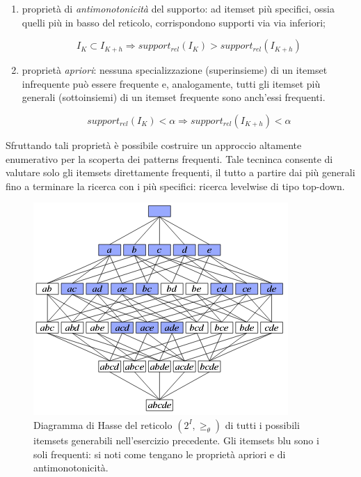 \begin{enumerate}[label=(\roman*)]
  
\item propriet{\`a} di \textit{antimonotonicit{\`a}} del supporto: ad itemset pi{\`u} specifici, ossia quelli pi{\`u} in basso del reticolo, corrispondono supporti via via inferiori;

\begin{equation}
I_K \subset I_{K+h} \Rightarrow support_{rel}(I_K) > support_{rel}(I_{K+h})
\end{equation}

\item propriet{\`a} \textit{apriori}: nessuna specializzazione (superinsieme) di un itemset infrequente pu{\`o} essere frequente e, analogamente, tutti gli itemset pi{\`u} generali (sottoinsiemi) di un itemset frequente sono anch'essi frequenti.

\begin{equation}
support_{rel}(I_K) < \alpha \Rightarrow support_{rel}(I_{K+h}) < \alpha
\end{equation}

\end{enumerate}

Sfruttando tali propriet{\`a} {\`e} possibile costruire un approccio altamente enumerativo per la scoperta dei patterns frequenti. Tale tecninca consente di valutare solo gli itemsets direttamente frequenti, il tutto a partire dai pi{\`u} generali fino a terminare la ricerca con i pi{\`u} specifici: ricerca levelwise di tipo top-down.

\begin{figure}\centering
\includegraphics[scale=0.65]{img/reticolo-itemsets-frequenti}
\caption{Diagramma di Hasse del reticolo $(2^I, \geq_{\theta})$ di tutti i possibili itemsets generabili nell'esercizio precedente. Gli itemsets blu sono i soli frequenti: si noti come tengano le propriet{\`a} apriori e di antimonotonicit{\`a}.}
\end{figure}


